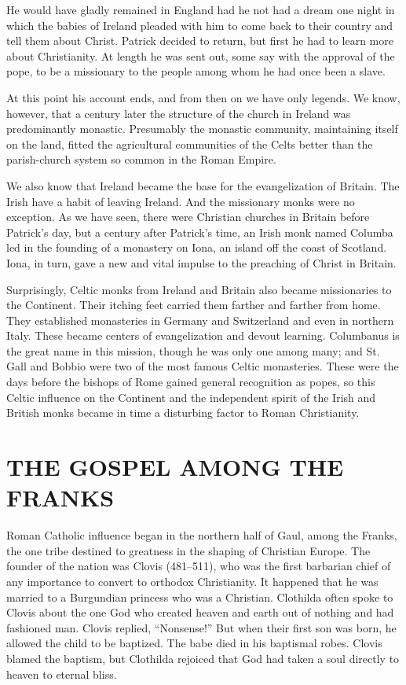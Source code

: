 He would have gladly remained in England had he not had a dream one night in which the babies of
Ireland pleaded with him to come back to their country and tell them about Christ. Patrick decided
to return, but first he had to learn more about Christianity. At length he was sent out, some say
with the approval of the pope, to be a missionary to the people among whom he had once been a slave.

At this point his account ends, and from then on we have only legends. We know, however, that a
century later the structure of the church in Ireland was predominantly monastic. Presumably the
monastic community, maintaining itself on the land, fitted the agricultural communities of the Celts
better than the parish-church system so common in the Roman Empire.

We also know that Ireland became the base for the evangelization of Britain. The Irish have a habit
of leaving Ireland. And the missionary monks were no exception. As we have seen, there were
Christian churches in Britain before Patrick’s day, but a century after Patrick’s time, an Irish
monk named Columba led in the founding of a monastery on Iona, an island off the coast of Scotland.
Iona, in turn, gave a new and vital impulse to the preaching of Christ in Britain.

Surprisingly, Celtic monks from Ireland and Britain also became missionaries to the Continent. Their
itching feet carried them farther and farther from home. They established monasteries in Germany and
Switzerland and even in northern Italy. These became centers of evangelization and devout learning.
Columbanus is the great name in this mission, though he was only one among many; and St. Gall and
Bobbio were two of the most famous Celtic monasteries. These were the days before the bishops of
Rome gained general recognition as popes, so this Celtic influence on the Continent and the
independent spirit of the Irish and British monks became in time a disturbing factor to Roman
Christianity.

\section{THE GOSPEL AMONG THE FRANKS}

Roman Catholic influence began in the northern half of Gaul, among the Franks, the one tribe
destined to greatness in the shaping of Christian Europe. The founder of the nation was Clovis
(481–511), who was the first barbarian chief of any importance to convert to orthodox Christianity.
It happened that he was married to a Burgundian princess who was a Christian. Clothilda often spoke
to Clovis about the one God who created heaven and earth out of nothing and had fashioned man.
Clovis replied, “Nonsense!” But when their first son was born, he allowed the child to be baptized.
The babe died in his baptismal robes. Clovis blamed the baptism, but Clothilda rejoiced that God had
taken a soul directly to heaven to eternal bliss.

